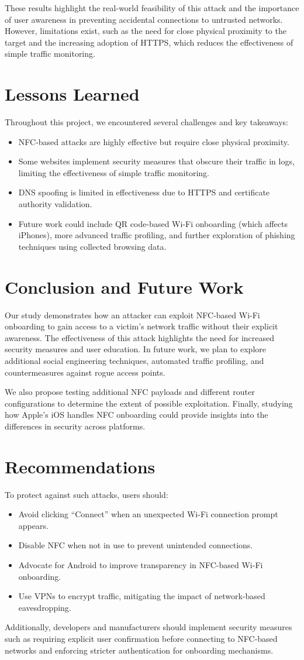 \documentclass[sigconf]{acmart}
\begin{document}
These results highlight the real-world feasibility of this attack and the importance of user awareness in preventing accidental connections to untrusted networks. However, limitations exist, such as the need for close physical proximity to the target and the increasing adoption of HTTPS, which reduces the effectiveness of simple traffic monitoring.

\section{Lessons Learned}
Throughout this project, we encountered several challenges and key takeaways:
\begin{itemize}
    \item NFC-based attacks are highly effective but require close physical proximity.
    \item Some websites implement security measures that obscure their traffic in logs, limiting the effectiveness of simple traffic monitoring.
    \item DNS spoofing is limited in effectiveness due to HTTPS and certificate authority validation.
    \item Future work could include QR code-based Wi-Fi onboarding (which affects iPhones), more advanced traffic profiling, and further exploration of phishing techniques using collected browsing data.
\end{itemize}

\section{Conclusion and Future Work}
Our study demonstrates how an attacker can exploit NFC-based Wi-Fi onboarding to gain access to a victim’s network traffic without their explicit awareness. The effectiveness of this attack highlights the need for increased security measures and user education. In future work, we plan to explore additional social engineering techniques, automated traffic profiling, and countermeasures against rogue access points.

We also propose testing additional NFC payloads and different router configurations to determine the extent of possible exploitation. Finally, studying how Apple’s iOS handles NFC onboarding could provide insights into the differences in security across platforms.

\section{Recommendations}
To protect against such attacks, users should:
\begin{itemize}
    \item Avoid clicking “Connect” when an unexpected Wi-Fi connection prompt appears.
    \item Disable NFC when not in use to prevent unintended connections.
    \item Advocate for Android to improve transparency in NFC-based Wi-Fi onboarding.
    \item Use VPNs to encrypt traffic, mitigating the impact of network-based eavesdropping.
\end{itemize}

Additionally, developers and manufacturers should implement security measures such as requiring explicit user confirmation before connecting to NFC-based networks and enforcing stricter authentication for onboarding mechanisms.



\end{document}
